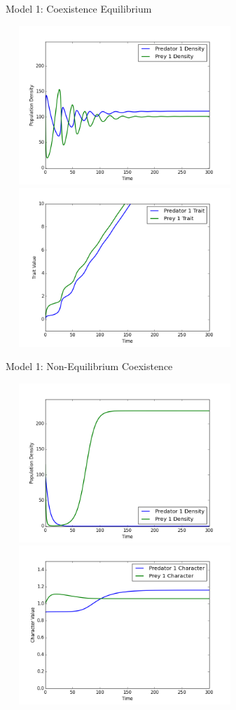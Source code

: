 \documentclass{amsart}
\theoremstyle{definition}
\theoremstyle{remark}
\numberwithin{equation}{section}
\begin{document}
\begin{centering}
\begin{figure}[h]
		\caption{Model 1: Coexistence Equilibrium}
		\label{fig:constant_growth_coexistence_equilibrium}
	\end{figure}
	\begin{figure}[h]
		\includegraphics[width=9cm,height=6cm]{figures/1x1/constant_growth/densities_unstable_coexistence.png}
		\includegraphics[width=9cm,height=6cm]{figures/1x1/constant_growth/traits_unstable_coexistence.png}
		\caption{Model 1: Non-Equilibrium Coexistence}
		\label{fig:constant_growth_non-equilibrium_coexistence}
	\end{figure}
	\begin{figure}[h]
		\includegraphics[width=9cm,height=6cm]{figures/1x1/variable_growth/stable_exclusion/densities.png}
		\includegraphics[width=9cm,height=6cm]{figures/1x1/variable_growth/stable_exclusion/traits.png}

\end{figure}
\end{centering}
\end{document}
